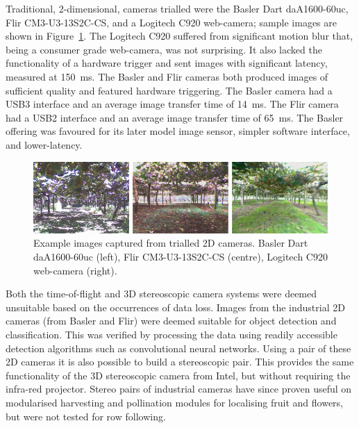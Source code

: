 \documentclass[preprint,authoryear,12pt]{elsarticle}
\begin{document}
        Traditional, 2-dimensional, cameras trialled were the Basler Dart daA1600-60uc, Flir CM3-U3-13S2C-CS, and a Logitech C920 web-camera; sample images are shown in Figure~\ref{fig:cameraComparison}.
        The Logitech C920 suffered from significant motion blur that, being a consumer grade web-camera, was not surprising.
        It also lacked the functionality of a hardware trigger and sent images with significant latency, measured at \SI{150}{\milli\second}.
        The Basler and Flir cameras both produced images of sufficient quality and featured hardware triggering.
        The Basler camera had a USB3 interface and an average image transfer time of \SI{14}{\milli\second}.
        The Flir camera had a USB2 interface and an average image transfer time of \SI{65}{\milli\second}.
        The Basler offering was favoured for its later model image sensor, simpler software interface, and lower-latency.

        \begin{figure}[htb]
            \centering
            \includegraphics[width=\linewidth]{images/camera_comparison.pdf}
            \caption{
                Example images captured from trialled 2D cameras.
                Basler Dart daA1600-60uc (left), Flir CM3-U3-13S2C-CS (centre), Logitech C920 web-camera (right).
            }
            \label{fig:cameraComparison}
        \end{figure}

        Both the time-of-flight and 3D stereoscopic camera systems were deemed unsuitable based on the occurrences of data loss.
        Images from the industrial 2D cameras (from Basler and Flir) were deemed suitable for object detection and classification.
        This was verified by processing the data using readily accessible detection algorithms such as convolutional neural networks.
        Using a pair of these 2D cameras it is also possible to build a stereoscopic pair.
        This provides the same functionality of the 3D stereoscopic camera from Intel, but without requiring the infra-red projector.
        Stereo pairs of industrial cameras have since proven useful on modularised harvesting and pollination modules for localising fruit and flowers, but were not tested for row following.
\end{document}
